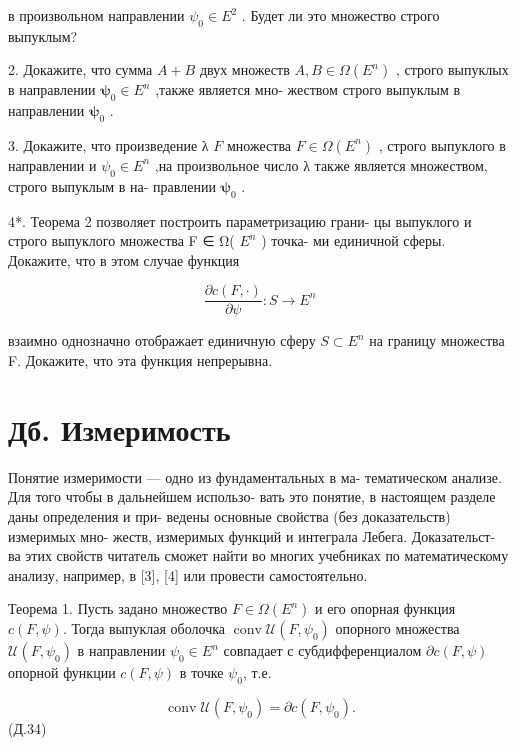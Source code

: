 \documentclass[8pt]{extarticle}
\begin{document}
в произвольном направлении \({\psi }_{0} \in  {E}^{2}\) . Будет ли это множество строго выпуклым?

2. Докажите, что сумма \(A + B\) двух множеств \(A,B \in  \Omega \left( {E}^{n}\right)\) , строго выпуклых в направлении \({\mathbf{\psi }}_{0} \in  {E}^{n}\) ,также является мно- жеством строго выпуклым в направлении \({\mathbf{\psi }}_{0}\) .

3. Докажите, что произведение λ \(F\) множества \(F \in  \Omega \left( {E}^{n}\right)\) , строго выпуклого в направлении и \({\psi }_{0} \in  {E}^{n}\) ,на произвольное число λ также является множеством, строго выпуклым в на- правлении \({\mathbf{\psi }}_{0}\) .

4*. Теорема 2 позволяет построить параметризацию грани- цы выпуклого и строго выпуклого множества F ∈ Ω( \({E}^{n}\) ) точка- ми единичной сферы. Докажите, что в этом случае функция

\[
\frac{\partial c\left( {F, \cdot  }\right) }{\partial \psi } : S \rightarrow  {E}^{n}
\]

взаимно однозначно отображает единичную сферу \(S \subset  {E}^{n}\) на границу множества F. Докажите, что эта функция непрерывна.

\section*{Дб. Измеримость}

Понятие измеримости — одно из фундаментальных в ма- тематическом анализе. Для того чтобы в дальнейшем использо- вать это понятие, в настоящем разделе даны определения и при- ведены основные свойства (без доказательств) измеримых мно- жеств, измеримых функций и интеграла Лебега. Доказательст- ва этих свойств читатель сможет найти во многих учебниках по математическому анализу, например, в [3], [4] или провести самостоятельно.

\fi

Теорема 1. Пусть задано множество \(F \in  \Omega \left( {E}^{n}\right)\) и его опорная функция \(c\left( {F,\psi }\right)\). Тогда выпуклая оболочка \(\operatorname{conv}\mathcal{U}\left( {F,{\psi }_{0}}\right)\) опорного множества \(\mathcal{U}\left( {F,{\psi }_{0}}\right)\) в направлении \({\psi }_{0} \in  {E}^{n}\) совпадает с субдифференциалом \(\partial c\left( {F,\psi }\right)\) опорной функции \(c\left( {F,\psi }\right)\) в точке \({\psi }_{0}\), т.е.

\[
\operatorname{conv}\mathcal{U}\left( {F,{\psi }_{0}}\right)  = \partial c\left( {F,{\psi }_{0}}\right) .
\]
 (Д.34)
\end{document}

